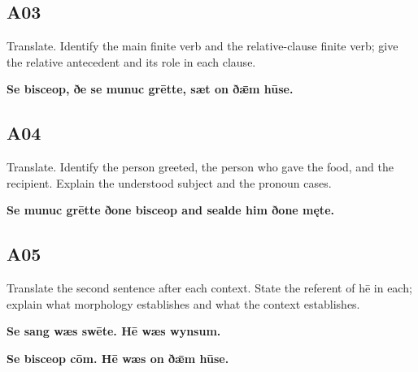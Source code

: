\par\begin{minipage}{\linewidth}\raggedright
\subsection*{A03}

Translate. Identify the main finite verb and the relative-clause finite verb; give the relative antecedent and its role in each clause.

\textbf{Se bisceop, ðe se munuc grētte, sæt on ðǣm hūse.}

\end{minipage}\par\addvspace{4pt}

\par\begin{minipage}{\linewidth}\raggedright
\subsection*{A04}

Translate. Identify the person greeted, the person who gave the food, and the recipient. Explain the understood subject and the pronoun cases.

\textbf{Se munuc grētte ðone bisceop and sealde him ðone męte.}

\end{minipage}\par\addvspace{4pt}

\par\begin{minipage}{\linewidth}\raggedright
\subsection*{A05}

Translate the second sentence after each context. State the referent of hē in each; explain what morphology establishes and what the context establishes.

\textbf{Se sang wæs swēte. Hē wæs wynsum.}

\textbf{Se bisceop cōm. Hē wæs on ðǣm hūse.}

\end{minipage}\par\addvspace{4pt}

